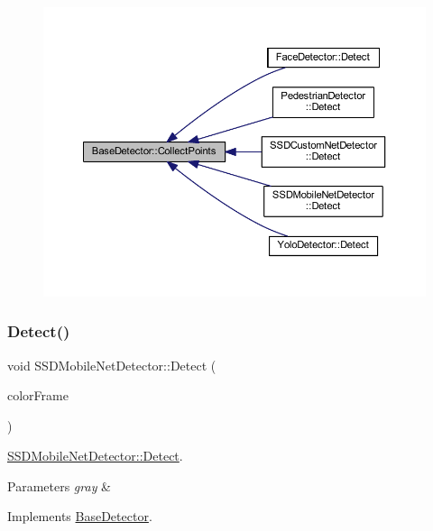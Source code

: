 \begin{figure}[H]
\begin{center}
\leavevmode
\includegraphics[width=350pt]{class_base_detector_a20380b0980c6f262b0829f37fb89d2a7_icgraph}
\end{center}
\end{figure}
\mbox{\label{class_s_s_d_mobile_net_detector_a6ac3fd479002779642ed185107d83dea}} 
\subsubsection{\texorpdfstring{Detect()}{Detect()}}
{\footnotesize\ttfamily void S\+S\+D\+Mobile\+Net\+Detector\+::\+Detect (\begin{DoxyParamCaption}\item[{cv\+::\+U\+Mat \&}]{color\+Frame }\end{DoxyParamCaption})\hspace{0.3cm}{\ttfamily [virtual]}}



\mbox{\hyperlink{class_s_s_d_mobile_net_detector_a6ac3fd479002779642ed185107d83dea}{S\+S\+D\+Mobile\+Net\+Detector\+::\+Detect}}. 


\begin{DoxyParams}{Parameters}
{\em gray} & \\
\hline
\end{DoxyParams}


Implements \mbox{\hyperlink{class_base_detector_a9c9dedfffb7673fd2995f24bdb9ade18}{Base\+Detector}}.



